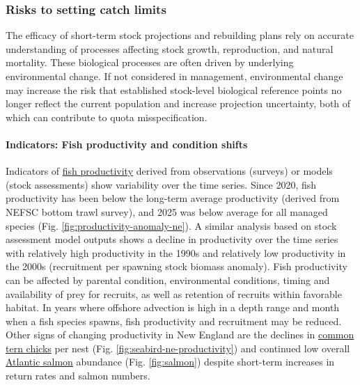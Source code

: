 \documentclass[
  10pt,
]{article}
\begin{document}
\subsubsection{Risks to setting catch limits}\label{risks-to-setting-catch-limits}

The efficacy of short-term stock projections and rebuilding plans rely on accurate understanding of processes affecting stock growth, reproduction, and natural mortality. These biological processes are often driven by underlying environmental change. If not considered in management, environmental change may increase the risk that established stock-level biological reference points no longer reflect the current population and increase projection uncertainty, both of which can contribute to quota misspecification.

\paragraph{Indicators: Fish productivity and condition shifts}\label{indicators-fish-productivity-and-condition-shifts}

Indicators of \href{https://noaa-edab.github.io/catalog/productivity_anomaly.html}{fish productivity} derived from observations (surveys) or models (stock assessments) show variability over the time series. Since 2020, fish productivity has been below the long-term average productivity (derived from NEFSC bottom trawl survey), and 2025 was below average for all managed species (Fig. \ref{fig:productivity-anomaly-ne}). A similar analysis based on stock assessment model outputs shows a decline in productivity over the time series with relatively high productivity in the 1990s and relatively low productivity in the 2000s (recruitment per spawning stock biomass anomaly). Fish productivity can be affected by parental condition, environmental conditions, timing and availability of prey for recruits, as well as retention of recruits within favorable habitat. In years where offshore advection is high in a depth range and month when a fish species spawns, fish productivity and recruitment may be reduced. Other signs of changing productivity in New England are the declines in \href{https://noaa-edab.github.io/catalog/seabird_ne.html}{common tern chicks} per nest (Fig. \ref{fig:seabird-ne-productivity}) and continued low overall \href{https://noaa-edab.github.io/catalog/gom_salmon.html}{Atlantic salmon} abundance (Fig. \ref{fig:salmon}) despite short-term increases in return rates and salmon numbers.
\end{document}
